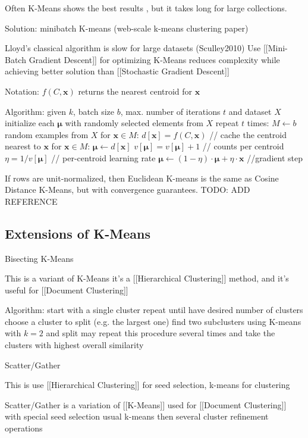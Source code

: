 Often K-Means shows the best results \cite{hall2012evaluating} \cite{steinbach2000comparison}, but it takes long for large collections.

Solution: minibatch K-means (web-scale k-means clustering paper) \cite{sculley2010web}

Lloyd's classical algorithm is slow for large datasets (Sculley2010)
Use [[Mini-Batch Gradient Descent]] for optimizing K-Means
reduces complexity while achieving better solution than [[Stochastic Gradient Descent]]

Notation:
$f(C, \mathbf x)$ returns the nearest centroid for $\mathbf x$


Algorithm:
 given $k$, batch size $b$, max. number of iterations $t$ and dataset $X$
 initialize each $\boldsymbol \mu$ with randomly selected elements from $X$
 repeat $t$ times:
 $M \leftarrow b$ random examples from $X$
 for $\mathbf x \in M$:
 $d[\mathbf x] = f(C, \mathbf x)$ // cache the centroid nearest to $\mathbf x$
 for $\mathbf x \in M$:
 $\boldsymbol \mu \leftarrow d[\mathbf x]$
 $v[\boldsymbol \mu] = v[\boldsymbol \mu] + 1$ // counts per centroid
 $\eta = 1 / v[\boldsymbol \mu]$ // per-centroid learning rate
 $\boldsymbol \mu \leftarrow (1 - \eta) \cdot \boldsymbol \mu + \eta \cdot \mathbf x$ //gradient step


If rows are unit-normalized, then Euclidean K-means is the same 
as Cosine Distance K-Means, but with convergence guarantees. 
TODO: ADD REFERENCE


\subsection{Extensions of K-Means} \label{sec:kmeans-ext}

Bisecting K-Means \cite{steinbach2000comparison}

This is a variant of K-Means
it's a [[Hierarchical Clustering]] method, and it's useful for [[Document Clustering]]


Algorithm:
start with a single cluster
 repeat until have desired number of clusters
 choose a cluster to split (e.g. the largest one)
 find two subclusters using K-means with $k = 2$ and split
 may repeat this procedure several times and take the clusters with highest overall similarity


Scatter/Gather \cite{cutting1992scatter}

This is
use [[Hierarchical Clustering]] for seed selection,
k-means for clustering

Scatter/Gather is a variation of [[K-Means]] used for [[Document Clustering]] with
special seed selection
usual k-means
then several cluster refinement operations


